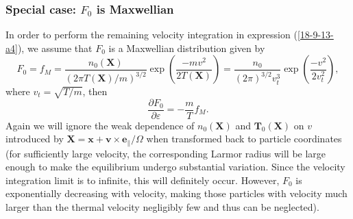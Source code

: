 \documentclass{article}
\begin{document}
\subsubsection{Special case: $F_0$ is Maxwellian}

In order to perform the remaining velocity integration in expression
(\ref{18-9-13-a4}), we assume that $F_0$ is a Maxwellian distribution given by
\begin{equation}
  F_0 = f_M = \frac{n_0 (\mathbf{X})}{(2 \pi T (\mathbf{X}) / m)^{3 / 2}} \exp
  \left( \frac{- m v^2}{2 T (\mathbf{X})} \right) = \frac{n_0}{(2 \pi)^{3 / 2}
  v_t^3} \exp \left( \frac{- v^2}{2 v_t^2} \right),
\end{equation}
where $v_t = \sqrt{T / m}$, then
\begin{equation}
  \label{18-9-13-p6} \frac{\partial F_0}{\partial \varepsilon} = - \frac{m}{T}
  f_M .
\end{equation}
Again we will ignore the weak dependence of $n_0 (\mathbf{X})$ and
$\mathbf{T}_0 (\mathbf{X})$ on $v$ introduced by
$\mathbf{X}=\mathbf{x}+\mathbf{v} \times \mathbf{e}_{\parallel} / \Omega$ when
transformed back to particle coordinates (for sufficiently large velocity, the
corresponding Larmor radius will be large enough to make the equilibrium
undergo substantial variation. Since the velocity integration limit is to
infinite, this will definitely occur. However, $F_0$ is exponentially
decreasing with velocity, making those particles with velocity much larger
than the thermal velocity negligibly few and thus can be neglected).
\end{document}
